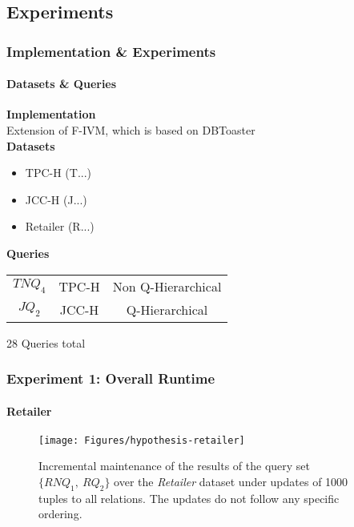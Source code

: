 \documentclass[
	11pt, %
]{beamer}
\begin{document}
\subsection{Experiments}
\begin{frame}
	\frametitle{Implementation \& Experiments}
	\framesubtitle{Datasets \& Queries}
	\textbf{Implementation}\\
	Extension of F-IVM, which is based on DBToaster\\
	\vspace{0.1cm}
	\textbf{Datasets}
	\begin{itemize}
		\item TPC-H	  (T...)
		\item JCC-H   (J...)
		\item Retailer  (R...)
	\end{itemize}
	\vspace{1em}
	\textbf{Queries}\\
	\vspace{0.5em}
	\begin{tabular}{c|c|c}
		$TNQ_4$ & TPC-H & Non Q-Hierarchical \\
		  \addlinespace[0.5em]
		\hline
		  \addlinespace[0.5em]
		$JQ_2$ & JCC-H & Q-Hierarchical \\
	\end{tabular}
	
	\vspace{1em}
	28 Queries total
\end{frame}


\begin{frame}
	\frametitle{Experiment 1: Overall Runtime}
	\framesubtitle{Retailer}
	\begin{figure}
		\begin{minipage}{0.25\textwidth}
		\end{minipage}
		\begin{minipage}{0.74\textwidth}
			\texttt{[image: Figures/hypothesis-retailer]} %
		\end{minipage}
		\caption{Incremental maintenance of the results of the query set $\{RNQ_1,\ RQ_2\}$ over the {\em Retailer} dataset under updates of 1000 tuples to all relations. The updates do not follow any specific ordering. }
	\end{figure}
\end{frame}
\end{document}
